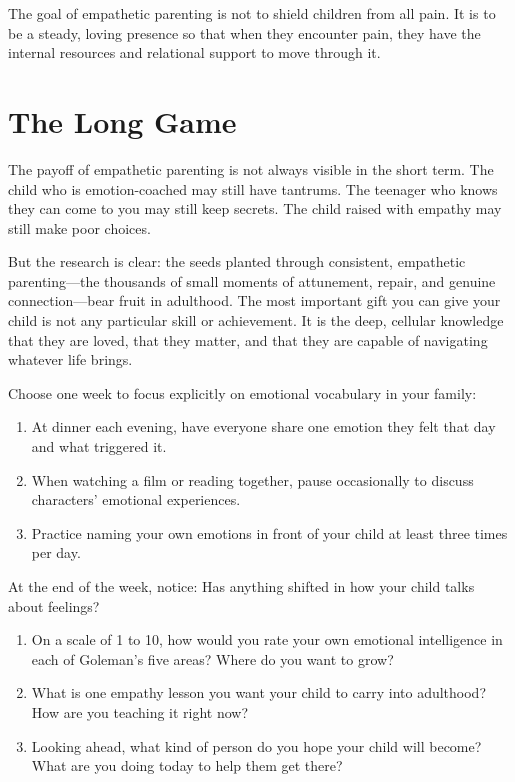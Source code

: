 \begin{keyinsight}
The goal of empathetic parenting is not to shield children from all pain.
It is to be a steady, loving presence so that when they encounter pain,
they have the internal resources and relational support to move through it.
\end{keyinsight}

\section{The Long Game}

The payoff of empathetic parenting is not always visible in the
short term. The child who is emotion-coached may still have tantrums.
The teenager who knows they can come to you may still keep secrets.
The child raised with empathy may still make poor choices.

But the research is clear: the seeds planted through consistent,
empathetic parenting---the thousands of small moments of attunement,
repair, and genuine connection---bear fruit in adulthood. The most
important gift you can give your child is not any particular skill or
achievement. It is the deep, cellular knowledge that they are loved,
that they matter, and that they are capable of navigating whatever life
brings.

\begin{practiceexercise}[title=Building the EI Vocabulary]
Choose one week to focus explicitly on emotional vocabulary in your
family:
\begin{enumerate}
  \item At dinner each evening, have everyone share one emotion they
        felt that day and what triggered it.
  \item When watching a film or reading together, pause occasionally
        to discuss characters' emotional experiences.
  \item Practice naming your own emotions in front of your child at
        least three times per day.
\end{enumerate}
At the end of the week, notice: Has anything shifted in how your child
talks about feelings?
\end{practiceexercise}

\begin{reflection}
\begin{enumerate}
  \item On a scale of 1 to 10, how would you rate your own emotional
        intelligence in each of Goleman's \citep{goleman1995} five areas? Where do you want
        to grow?
  \item What is one empathy lesson you want your child to carry into
        adulthood? How are you teaching it right now?
  \item Looking ahead, what kind of person do you hope your child will
        become? What are you doing today to help them get there?
\end{enumerate}
\end{reflection}
